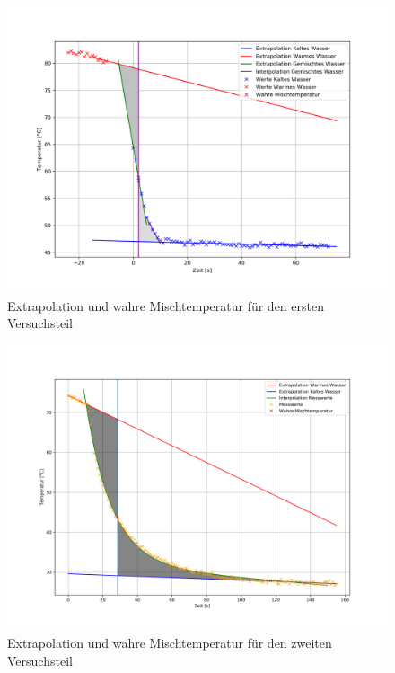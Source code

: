 \documentclass[11pt,a4paper]{article}
\begin{document}
\begin{figure}
\centering
\includegraphics[width=1\textwidth]{Kalimix}
\renewcommand\thefigure{B2}
\caption{Extrapolation und wahre Mischtemperatur f\"ur den ersten Versuchsteil}
\label{Abb:2}
\end{figure}

\begin{figure}
\centering
\includegraphics[width=1\textwidth]{Glob}
\renewcommand\thefigure{B3} 
\vspace{-22pt}
\caption{Extrapolation und wahre Mischtemperatur f\"ur den zweiten Versuchsteil}
\label{Abb:3}
\end{figure} 
\end{document}
